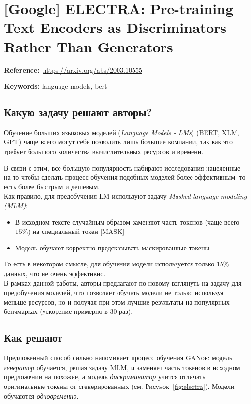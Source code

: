 \chapter{[Google] ELECTRA: Pre-training Text Encoders as Discriminators Rather Than Generators}

\textbf{Reference:}~\url{https://arxiv.org/abs/2003.10555}

\textbf{Keywords:} language models, bert

\section*{Какую задачу решают авторы?}

Обучение больших языковых моделей (\textit{Language Models - LMs}) (BERT, XLM, GPT) чаще всего могут себе позволить лишь большие компании, так как это требует большого количества вычислительных ресурсов и времени.

В связи с этим, все большую популярность набирают исследования нацеленные на то чтобы сделать процесс обучения подобных моделей более эффективным, то есть более быстрым и дешевым. \\

Как правило, для предобучения LM используют задачу \textit{Masked language modeling (MLM)}:
\begin{itemize}
    \item В исходном тексте случайным образом заменяют часть токенов (чаще всего $15\%$) на специальный токен [MASK]
    \item Модель обучают корректно предсказывать маскированные токены
\end{itemize}

То есть в некотором смысле, для обучения модели используется только $15\%$ данных, что не очень эффективно. \\

В рамках данной работы, авторы предлагают по новому взглянуть на задачу для предобучения моделей, что позволяет обучать модели не только используя меньше ресурсов, но и получая при этом лучшие результаты на популярных бенчмарках (ускорение примерно в 30 раз).

\section*{Как решают}

Предложенный способ сильно напоминает процесс обучения GANов: модель \textit{генератор} обучается, решая задачу MLM, и заменяет часть токенов в исходном предложении на похожие, а модель \textit{дискриминатор} учится отличать оригинальные токены от сгенерированных (см. Рисунок~\ref{fig:electra}). Модели обучаются \textit{одновременно}.

